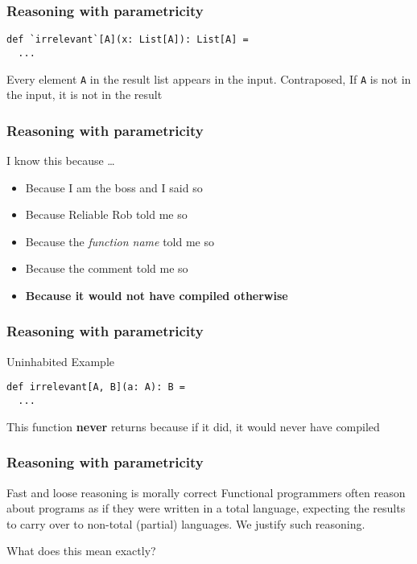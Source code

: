 \begin{frame}[fragile]
\frametitle{Reasoning with parametricity}
\begin{lstlisting}[style=scala]
def `irrelevant`[A](x: List[A]): List[A] = 
  ...
\end{lstlisting}
\begin{theorem}Every element \lstinline{A} in the result list appears in the input. Contraposed, If \lstinline{A} is not in the input, it is not in the result\end{theorem}
\end{frame}

\begin{frame}[fragile]
\frametitle{Reasoning with parametricity}
\begin{block}{I know this because \ldots}
\begin{itemize}
  \item<1> Because I am the boss and I said so
  \item<2> Because Reliable Rob told me so
  \item<3> Because the \emph{function name} told me so
  \item<4> Because the comment told me so
  \item<5> \textbf{Because it would not have compiled otherwise}
\end{itemize}
\end{block}
\end{frame}

\begin{frame}[fragile]
\frametitle{Reasoning with parametricity}
\begin{block}{Uninhabited Example}
\begin{lstlisting}[style=scala]
def irrelevant[A, B](a: A): B = 
  ...
\end{lstlisting}
\end{block}
\begin{theorem}This function \textbf{never} returns because if it did, it would
never have compiled\end{theorem}
\end{frame}

\begin{frame}[fragile]
\frametitle{Reasoning with parametricity}
\begin{block}{Fast and loose reasoning is morally correct \cite{danielsson2006fast}}
\small{Functional programmers often reason about programs as if
they were written in a total language, expecting the results
to carry over to non-total (partial) languages. We justify
such reasoning.}
\end{block}
What does this mean exactly?
\end{frame}
